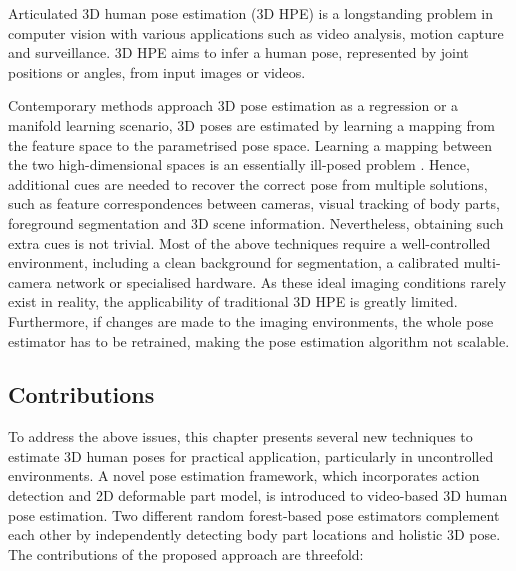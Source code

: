 Articulated 3D human pose estimation (3D HPE) is a longstanding problem in computer vision with various applications such as video analysis, motion capture and surveillance.
3D HPE aims to infer a human pose, represented by joint positions or angles, from input images or videos. 

Contemporary methods approach 3D pose estimation as a regression or a manifold learning scenario, 3D poses are estimated by learning a mapping from the feature space to the parametrised pose space. 
Learning a mapping between the two high-dimensional spaces is an essentially ill-posed problem \cite{Elgammal2004}. Hence, additional cues are needed to recover the correct pose from multiple solutions, such as feature correspondences between cameras, visual tracking of body parts, foreground segmentation and 3D scene information. 
Nevertheless, obtaining such extra cues is not trivial. 
Most of the above techniques require a well-controlled environment, including a clean background for segmentation, a calibrated multi-camera network or specialised hardware.   
As these ideal imaging conditions rarely exist in reality, the applicability of traditional 3D HPE is greatly limited. 
Furthermore, if changes are made to the imaging environments, the whole pose estimator has to be retrained, making the pose estimation algorithm not scalable. 


\subsection{Contributions}

To address the above issues, this chapter presents several new techniques to estimate 3D human poses for practical application, particularly in uncontrolled environments. 
A novel pose estimation framework, which incorporates action detection and 2D deformable part model, is introduced to video-based 3D human pose estimation. 
Two different random forest-based pose estimators complement each other by independently detecting body part locations and holistic 3D pose. The contributions of the proposed approach are threefold:  

